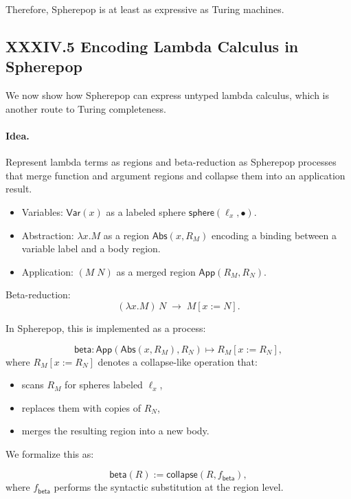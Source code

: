 \documentclass[11pt,letterpaper]{article}
\begin{document}
Therefore, Spherepop is at least as expressive as Turing machines.

\subsection{XXXIV.5 Encoding Lambda Calculus in Spherepop}

We now show how Spherepop can express untyped lambda calculus, which is another route to Turing completeness.

\paragraph{Idea.} Represent lambda terms as regions and beta-reduction as Spherepop processes that merge function and argument regions and collapse them into an application result.

\begin{itemize}
  \item Variables: $\mathsf{Var}(x)$ as a labeled sphere $\mathsf{sphere}(\ell_x, \bullet)$.
  \item Abstraction: $\lambda x. M$ as a region $\mathsf{Abs}(x, R_M)$ encoding a binding between a variable label and a body region.
  \item Application: $(M\;N)$ as a merged region $\mathsf{App}(R_M, R_N)$.
\end{itemize}

Beta-reduction:
\[
(\lambda x. M)\,N \;\to\; M[x := N].
\]

In Spherepop, this is implemented as a process:

\[
\mathsf{beta} :
\mathsf{App}(\mathsf{Abs}(x, R_M), R_N)
\mapsto
R_M[x := R_N],
\]
where $R_M[x := R_N]$ denotes a collapse-like operation that:

\begin{itemize}
  \item scans $R_M$ for spheres labeled $\ell_x$,
  \item replaces them with copies of $R_N$,
  \item merges the resulting region into a new body.
\end{itemize}

We formalize this as:

\[
\mathsf{beta}(R) := \mathsf{collapse}(R, f_{\mathsf{beta}}),
\]
where $f_{\mathsf{beta}}$ performs the syntactic substitution at the region level.
\end{document}
